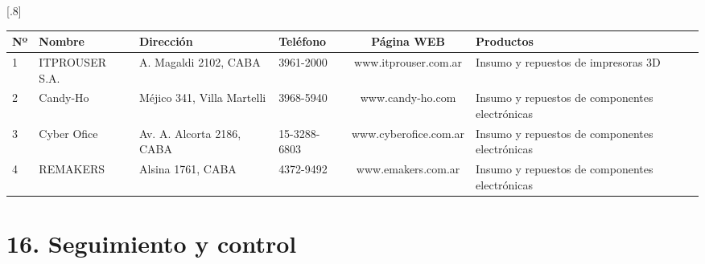 \documentclass[11pt]{charter}
\begin{document}
\renewcommand{\tabularxcolumn}[1]{>{\arraybackslash}m{#1}}
\begin{table}[htpb]
\centering
\scalebox{1}[.8]{
\begin{tabularx}{\textwidth}{@{}|p{3em}|X|X|X|c|X|@{}}
\hline
\rowcolor[HTML]{CCFFFF} 
Nº & Nombre & Dirección & Teléfono & Página WEB & Productos \\ \hline
             
1 &
ITPROUSER S.A. &
A. Magaldi 2102, CABA &
3961-2000 &
www.itprouser.com.ar&
Insumo y repuestos de impresoras 3D \\ \hline
2 &
Candy-Ho &
Méjico 341, Villa Martelli &
3968-5940 &
www.candy-ho.com&
Insumo y repuestos de componentes electrónicas\\ \hline
3 &
Cyber Ofice &
Av. A. Alcorta 2186, CABA &
15-3288-6803 &
www.cyberofice.com.ar&
Insumo y repuestos de componentes electrónicas\\ \hline
4 &
REMAKERS &
Alsina 1761, CABA &
4372-9492 &
www.emakers.com.ar&
Insumo y repuestos de componentes electrónicas\\ \hline
               
\end{tabularx}
}
\end{table}


\section{16. Seguimiento y control}
\label{sec:seguimiento}

%
%
%
\end{document}
